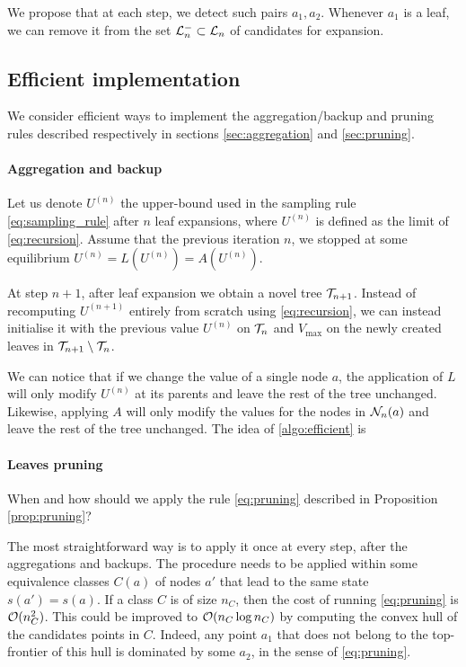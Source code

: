 \documentclass{article}
\begin{document}
We propose that at each step, we detect such pairs $a_1, a_2$. Whenever $a_1$ is a leaf, we can remove it from the set $\mathcal{L}_n^-\subset \mathcal{L}_n $ of candidates for expansion.

\subsection{Efficient implementation}

We consider efficient ways to implement the aggregation/backup and pruning rules described respectively in sections \ref{sec:aggregation} and \ref{sec:pruning}.

\paragraph{Aggregation and backup}
Let us denote $U^{(n)}$ the upper-bound used in the sampling rule \eqref{eq:sampling_rule} after $n$ leaf expansions, where $U^{(n)}$ is defined as the limit of \eqref{eq:recursion}. Assume that the previous iteration $n$, we stopped at some equilibrium $U^{(n)} = L(U^{(n)}) = A(U^{(n)})$.

At step $n+1$, after leaf expansion we obtain a novel tree $\mathcal{T}_{n+1}$. Instead of recomputing $U^{(n+1)}$ entirely from scratch using \eqref{eq:recursion}, we can instead initialise it with the previous value $U^{(n)}$ on $\mathcal{T}_n$ and $V_{\max}$ on the newly created leaves in $\mathcal{T}_{n+1} \setminus \mathcal{T}_n$.

We can notice that if we change the value of a single node $a$, the application of $L$ will only modify $U^{(n)}$ at its parents and leave the rest of the tree unchanged. Likewise, applying $A$ will only modify the values for the nodes in $\mathcal{N}_n(a)$ and leave the rest of the tree unchanged. The idea of \autoref{algo:efficient} is

\paragraph{Leaves pruning}

When and how should we apply the rule \eqref{eq:pruning} described in Proposition \autoref{prop:pruning}?

The most straightforward way is to apply it once at every step, after the aggregations and backups.
The procedure needs to be applied within some equivalence classes $C(a)$ of nodes $a'$ that lead to the same state $s(a')=s(a)$. If a class $C$ is of size $n_C$, then the cost of running \eqref{eq:pruning} is $\mathcal{O}(n_C^2)$. This could be improved to $\mathcal{O}(n_C \log n_C)$ by computing the convex hull of the candidates points in $C$. Indeed, any point $a_1$ that does not belong to the top-frontier of this hull is dominated by some $a_2$, in the sense of \eqref{eq:pruning}.
\end{document}
